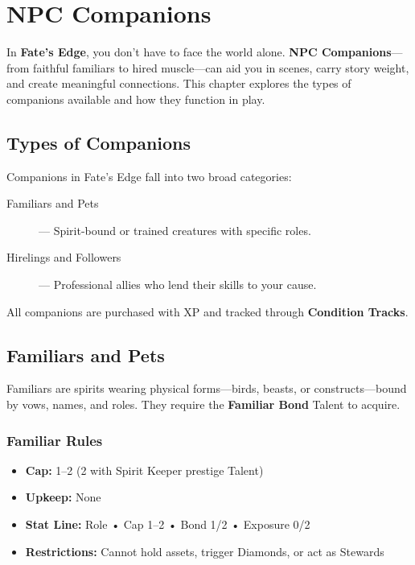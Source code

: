 
\chapter{NPC Companions}
\label{ch:npc-companions}

In \textbf{Fate's Edge}, you don't have to face the world alone. \textbf{NPC Companions}—from faithful familiars to hired muscle—can aid you in scenes, carry story weight, and create meaningful connections. This chapter explores the types of companions available and how they function in play.

\section{Types of Companions}

Companions in Fate's Edge fall into two broad categories:

\begin{description}
  \item[Familiars and Pets]  — Spirit-bound or trained creatures with specific roles.
  \item[Hirelings and Followers]  — Professional allies who lend their skills to your cause.
\end{description}

All companions are purchased with XP and tracked through \textbf{Condition Tracks}.

\section{Familiars and Pets}

Familiars are spirits wearing physical forms—birds, beasts, or constructs—bound by vows, names, and roles. They require the \textbf{Familiar Bond} Talent to acquire.

\subsection*{Familiar Rules}

\begin{itemize}
  \item \textbf{Cap:} 1–2 (2 with Spirit Keeper prestige Talent)
  \item \textbf{Upkeep:} None
  \item \textbf{Stat Line:} Role • Cap 1–2 • Bond 1/2 • Exposure 0/2
  \item \textbf{Restrictions:} Cannot hold assets, trigger Diamonds, or act as Stewards
\end{itemize}


